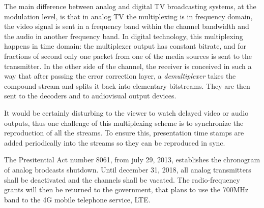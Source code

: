 \documentclass[
	12pt,				%
	openright,			%
	twoside,			%
	a4paper,			%
	brazil,
	french,				%
	english
	]{abntex2}
\begin{document}
The main difference between analog and digital TV broadcasting systems, at the modulation level, is that in analog TV the multiplexing is in frequency domain, the video signal is sent in a frequency band within the channel bandwidth and the audio in another frequency band. In digital technology, this multiplexing happens in time domain: the multiplexer output has constant bitrate, and for fractions of second only one packet from one of the media sources is sent to the transmitter. In the other side of the channel, the receiver is conceived in such a way that after passing the error correction layer, a \textit{demultiplexer} takes the compound stream and splits it back into elementary bitstreams. They are then sent to the decoders and to audiovisual output devices.

It would be certainly disturbing to the viewer to watch delayed video or audio outputs, thus one challenge of this multiplexing scheme is to synchronize the reproduction of all the streams. To ensure this, presentation time stamps are added periodically into the streams so they can be reproduced in sync.


The Presitential Act number 8061\cite{decreto8061}, from july 29, 2013, establishes the chronogram of analog brodcasts shutdown. Until december 31, 2018, all analog transmitters shall be deactivated and the channels shall be vacated. The radio-frequency grants will then be returned to the government, that plans to use the 700MHz band to the 4G mobile telephone service, LTE.

\end{document}
